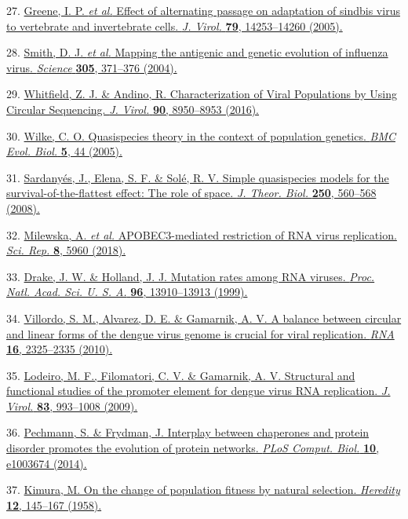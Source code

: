 \documentclass[
]{article}
\begin{document}
27. \href{http://paperpile.com/b/REZjPf/YjlCW}{Greene, I. P. \emph{et
al.} Effect of alternating passage on adaptation of sindbis virus to
vertebrate and invertebrate cells. \emph{J. Virol.} \textbf{79},
14253--14260 (2005).}

28. \href{http://paperpile.com/b/REZjPf/jN2vZ}{Smith, D. J. \emph{et
al.} Mapping the antigenic and genetic evolution of influenza virus.
\emph{Science} \textbf{305}, 371--376 (2004).}

29. \href{http://paperpile.com/b/REZjPf/jDAqh}{Whitfield, Z. J. \&
Andino, R. Characterization of Viral Populations by Using Circular
Sequencing. \emph{J. Virol.} \textbf{90}, 8950--8953 (2016).}

30. \href{http://paperpile.com/b/REZjPf/Clw9O}{Wilke, C. O. Quasispecies
theory in the context of population genetics. \emph{BMC Evol. Biol.}
\textbf{5}, 44 (2005).}

31. \href{http://paperpile.com/b/REZjPf/rZbzc}{Sardanyés, J., Elena, S.
F. \& Solé, R. V. Simple quasispecies models for the
survival-of-the-flattest effect: The role of space. \emph{J. Theor.
Biol.} \textbf{250}, 560--568 (2008).}

32. \href{http://paperpile.com/b/REZjPf/M9gyT}{Milewska, A. \emph{et
al.} APOBEC3-mediated restriction of RNA virus replication. \emph{Sci.
Rep.} \textbf{8}, 5960 (2018).}

33. \href{http://paperpile.com/b/REZjPf/I2u2G}{Drake, J. W. \& Holland,
J. J. Mutation rates among RNA viruses. \emph{Proc. Natl. Acad. Sci. U.
S. A.} \textbf{96}, 13910--13913 (1999).}

34. \href{http://paperpile.com/b/REZjPf/delW7}{Villordo, S. M., Alvarez,
D. E. \& Gamarnik, A. V. A balance between circular and linear forms of
the dengue virus genome is crucial for viral replication. \emph{RNA}
\textbf{16}, 2325--2335 (2010).}

35. \href{http://paperpile.com/b/REZjPf/4f1JN}{Lodeiro, M. F.,
Filomatori, C. V. \& Gamarnik, A. V. Structural and functional studies
of the promoter element for dengue virus RNA replication. \emph{J.
Virol.} \textbf{83}, 993--1008 (2009).}

36. \href{http://paperpile.com/b/REZjPf/EVbva}{Pechmann, S. \& Frydman,
J. Interplay between chaperones and protein disorder promotes the
evolution of protein networks. \emph{PLoS Comput. Biol.} \textbf{10},
e1003674 (2014).}

37. \href{http://paperpile.com/b/REZjPf/rysMZ}{Kimura, M. On the change
of population fitness by natural selection. \emph{Heredity} \textbf{12},
145--167 (1958).}
\end{document}
